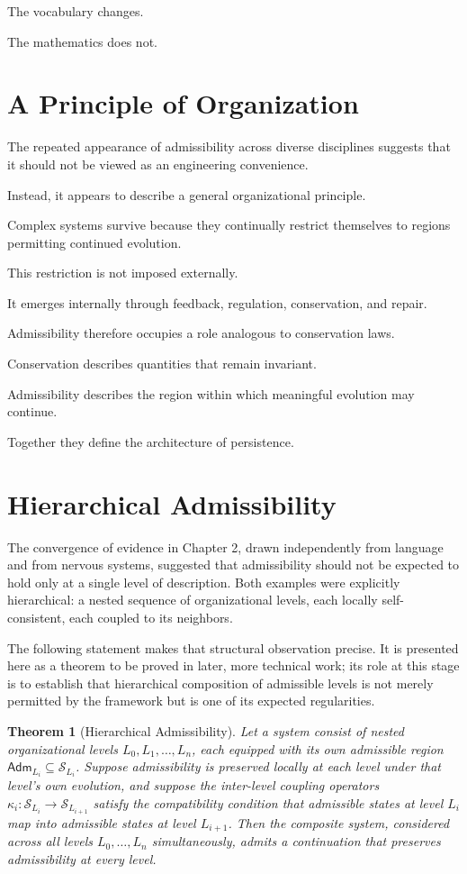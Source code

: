 \documentclass[11pt,oneside]{book}
\numberwithin{equation}{chapter}
\theoremstyle{definition}
\theoremstyle{plain}
\newtheorem{theorem}[definition]{Theorem}
\newcommand{\State}{\mathcal{S}}
\newcommand{\Adm}{\mathsf{Adm}}
\begin{document}
The vocabulary changes.

The mathematics does not.

\section{A Principle of Organization}

The repeated appearance of admissibility across diverse disciplines suggests
that it should not be viewed as an engineering convenience.

Instead, it appears to describe a general organizational principle.

Complex systems survive because they continually restrict themselves to
regions permitting continued evolution.

This restriction is not imposed externally.

It emerges internally through feedback, regulation, conservation, and
repair.

Admissibility therefore occupies a role analogous to conservation laws.

Conservation describes quantities that remain invariant.

Admissibility describes the region within which meaningful evolution may
continue.

Together they define the architecture of persistence.

\section{Hierarchical Admissibility}

The convergence of evidence in Chapter 2, drawn independently from language
and from nervous systems, suggested that admissibility should not be
expected to hold only at a single level of description. Both examples were
explicitly hierarchical: a nested sequence of organizational levels, each
locally self-consistent, each coupled to its neighbors.

The following statement makes that structural observation precise. It is
presented here as a theorem to be proved in later, more technical work; its
role at this stage is to establish that hierarchical composition of
admissible levels is not merely permitted by the framework but is one of its
expected regularities.

\begin{theorem}[Hierarchical Admissibility]
Let a system consist of nested organizational levels
\(L_0, L_1, \ldots, L_n\), each equipped with its own admissible region
\(\Adm_{L_i} \subseteq \State_{L_i}\). Suppose admissibility is preserved
locally at each level under that level's own evolution, and suppose the
inter-level coupling operators
\(
\kappa_i : \State_{L_i} \rightarrow \State_{L_{i+1}}
\)
satisfy the compatibility condition that admissible states at level
\(L_i\) map into admissible states at level \(L_{i+1}\). Then the
composite system, considered across all levels
\(L_0, \ldots, L_n\) simultaneously, admits a continuation that preserves
admissibility at every level.
\end{theorem}
\end{document}
